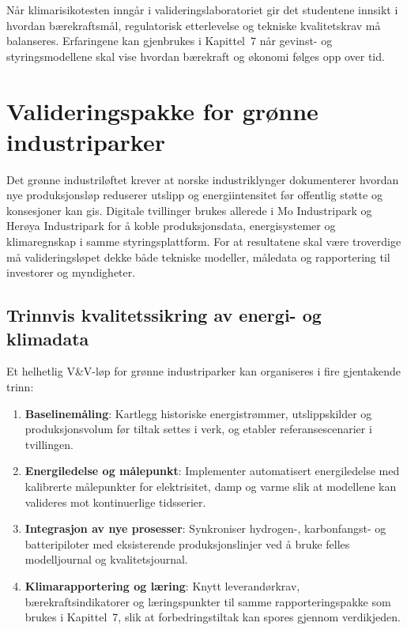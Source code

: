 Når klimarisikotesten inngår i valideringslaboratoriet gir det studentene innsikt i hvordan bærekraftsmål, regulatorisk etterlevelse og tekniske kvalitetskrav må balanseres. Erfaringene kan gjenbrukes i Kapittel~7 når gevinst- og styringsmodellene skal vise hvordan bærekraft og økonomi følges opp over tid.

\section{Valideringspakke for grønne industriparker}
Det grønne industriløftet krever at norske industriklynger dokumenterer hvordan nye produksjonsløp reduserer utslipp og energiintensitet før offentlig støtte og konsesjoner kan gis.\citep{regjeringen2023grontindustriloft} Digitale tvillinger brukes allerede i Mo Industripark og Herøya Industripark for å koble produksjonsdata, energisystemer og klimaregnskap i samme styringsplattform.\citep{moindustripark2024klimaplan,heroya2024hydrogenhub} For at resultatene skal være troverdige må valideringsløpet dekke både tekniske modeller, måledata og rapportering til investorer og myndigheter.

\subsection{Trinnvis kvalitetssikring av energi- og klimadata}
Et helhetlig V\&V-løp for grønne industriparker kan organiseres i fire gjentakende trinn:
\begin{enumerate}
    \item \textbf{Baselinemåling}: Kartlegg historiske energistrømmer, utslippskilder og produksjonsvolum før tiltak settes i verk, og etabler referansescenarier i tvillingen.\citep{moindustripark2024klimaplan}
    \item \textbf{Energiledelse og målepunkt}: Implementer automatisert energiledelse med kalibrerte målepunkter for elektrisitet, damp og varme slik at modellene kan valideres mot kontinuerlige tidsserier.\citep{enova2024energiledelse}
    \item \textbf{Integrasjon av nye prosesser}: Synkroniser hydrogen-, karbonfangst- og batteripiloter med eksisterende produksjonslinjer ved å bruke felles modelljournal og kvalitetsjournal.\citep{heroya2024hydrogenhub}
    \item \textbf{Klimarapportering og læring}: Knytt leverandørkrav, bærekraftsindikatorer og læringspunkter til samme rapporteringspakke som brukes i Kapittel~7, slik at forbedringstiltak kan spores gjennom verdikjeden.\citep{eyde2023batteri}
\end{enumerate}

